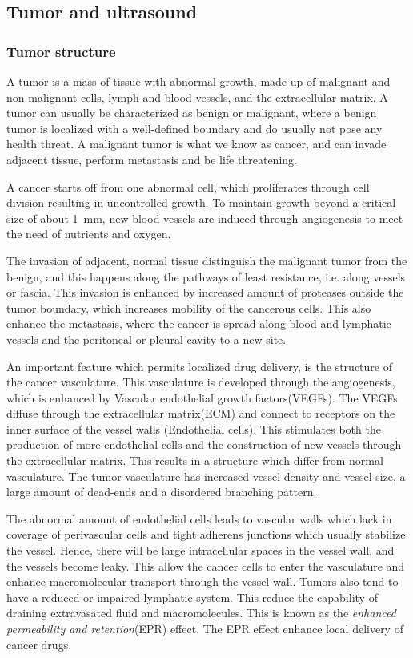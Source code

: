 \clearpage
\subsection{Tumor and ultrasound}
\subsubsection{Tumor structure}

 A tumor is a mass of tissue with abnormal growth, made up of malignant and non-malignant cells, lymph and blood vessels, and the extracellular matrix. A tumor can usually be characterized as benign or malignant, where a benign tumor is localized with a well-defined boundary and do usually not pose any health threat. A malignant tumor is what we know as cancer, and can invade adjacent tissue, perform metastasis and be life threatening\cite{king2006cancer}. 

A cancer starts off from one abnormal cell, which proliferates through cell division resulting in uncontrolled growth. To maintain growth beyond a critical size of about \SI{1}{\milli\metre}\cite{king2006cancer}, new blood vessels are induced through angiogenesis to meet the need of nutrients and oxygen. 

The invasion of adjacent, normal tissue distinguish the malignant tumor from the benign, and this happens along  the pathways of least resistance, i.e. along vessels or fascia. This invasion is enhanced by increased amount of proteases outside the tumor boundary, which increases mobility of the cancerous cells. This also enhance the metastasis, where the cancer is spread along blood and lymphatic vessels and the peritoneal or pleural cavity to a new site\cite{king2006cancer}.
 
An important feature which permits localized drug delivery, is the structure of the cancer vasculature. This vasculature is developed through the angiogenesis, which is enhanced by Vascular endothelial growth factors(VEGFs). The VEGFs diffuse through the extracellular matrix(ECM) and connect to receptors on the inner surface of the vessel walls (Endothelial cells)\cite{Koumoutsakos2013}. This stimulates both the production of more endothelial cells and the construction of new vessels through the extracellular matrix\cite{Nishida2006}. This results in a structure which differ from normal vasculature. The tumor vasculature has increased vessel density and vessel size, a large amount of dead-ends and a disordered branching pattern.    

The abnormal amount of endothelial cells leads to vascular walls which lack in coverage of perivascular cells and tight adherens junctions which usually stabilize the vessel. Hence, there will be large intracellular spaces in the vessel wall, and the vessels become leaky. This allow the cancer cells to enter the vasculature and enhance macromolecular transport through the vessel wall. Tumors also tend to have a reduced or impaired lymphatic system. This reduce the capability of draining extravasated fluid and macromolecules. This is known as the \textit{enhanced permeability and retention}(EPR) effect\cite{Matsumura1986}. The EPR effect enhance local delivery of cancer drugs.



